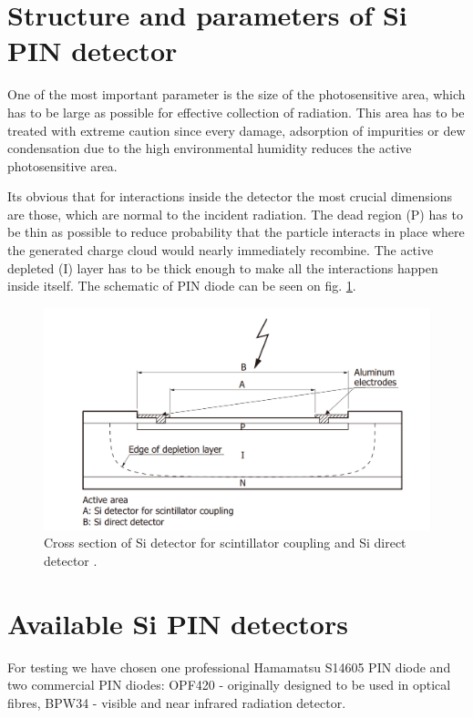 \section{Structure and parameters of Si PIN detector}
One of the most important parameter is the size of the photosensitive area, which has to be large as possible for effective collection of radiation. This area has to be treated with extreme caution since every damage, adsorption of impurities or dew condensation due to the high environmental humidity reduces the active photosensitive area.

\par
Its obvious that for interactions inside the detector the most crucial dimensions are those, which are normal to the incident radiation.
The dead region (P) has to be thin as possible to reduce probability that the particle interacts in place where the generated charge cloud would nearly immediately recombine. The active depleted (I) layer has to be thick enough to make all the interactions happen inside itself. The schematic of PIN diode can be seen on fig. \ref{SiPIN}.


\begin{figure}[H]
 \centering
 \includegraphics[scale=0.35, angle = 0]{./pictures/SiPINScheme.png}
 \caption{Cross section of Si detector for scintillator coupling and Si direct detector \cite{SiPINdirect}.}
 \label{SiPIN}
 
\end{figure}



\section{Available Si PIN detectors}
For testing we have chosen one professional Hamamatsu S14605 PIN diode and two commercial PIN diodes: OPF420 - originally designed to be used in optical fibres, BPW34 - visible and near infrared radiation detector.  



